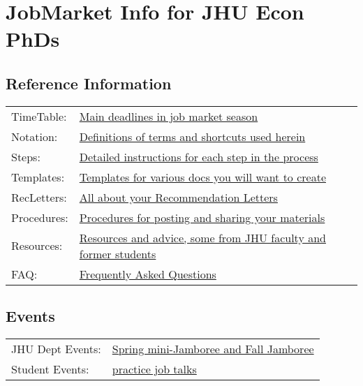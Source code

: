 \documentclass{\econtex}
\begin{document}
\medskip


\section*{JobMarket Info for JHU Econ PhDs}
\subsection*{Reference Information}

\medskip

\begin{tabular}{ll}
  TimeTable: & \href{\pageurl/TimeTable}{Main deadlines in job market season} \\
  Notation: & \href{\pageurl/Notation}{Definitions of terms and shortcuts used herein} \\
  Steps: & \href{\pageurl/Steps}{Detailed instructions for each step in the process} \\
  Templates: & \href{\bloburl/Templates}{Templates for various docs you will want to create} \\
  RecLetters: & \href{\pageurl/RecLetters}{All about your Recommendation Letters} \\
  Procedures: & \href{\bloburl/JobMarketProceduresHelp.md}{Procedures for posting and sharing your materials} \\
  Resources: & \href{\bloburl/Resources}{Resources and advice, some from JHU faculty and former students} \\
  FAQ: & \href{\pageurl/FAQ}{Frequently Asked Questions} \\
\end{tabular}

\medskip

\subsection*{Events}
\begin{tabular}{ll}
  JHU Dept Events: & \href{\pageurl/Jamborees}{Spring mini-Jamboree and Fall Jamboree} \\
  Student Events: &  \href{https://jh.hosted.panopto.com/Panopto/Pages/Sessions/List.aspx?folderID=4a25e803-cd94-4e31-b350-b00500e50267}{practice job talks}
\end{tabular}
\end{document}
